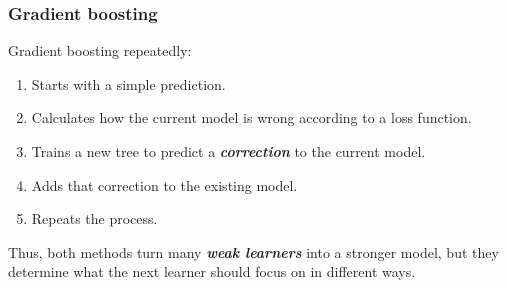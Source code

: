 \documentclass{course_sheet}
\begin{document}
\subsubsection*{Gradient boosting}
Gradient boosting repeatedly:

\begin{enumerate}
\item
Starts with a simple prediction.

\item
Calculates how the current model is wrong according to a loss function.

\item
Trains a new tree to predict a \textbf{\textit{correction}} to the current model.

\item
Adds that correction to the existing model.

\item
Repeats the process.

\end{enumerate}
Thus, both methods turn many \textbf{\textit{weak learners}} into a stronger model, but they determine what the next learner should focus on in different ways.
\end{document}
